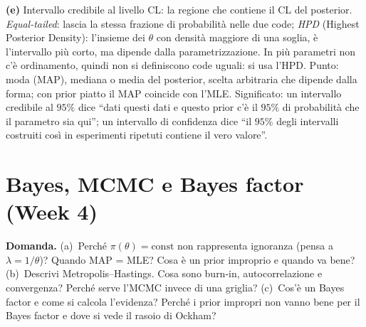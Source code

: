 \documentclass[11pt,a4paper]{article}
\newcommand{\Dom}[1]{\par\medskip\noindent\textbf{Domanda.} #1\par\nopagebreak}
\begin{document}
{\textbf{(e)} Intervallo credibile al livello CL: la regione che contiene il CL del posterior.
\emph{Equal-tailed}: lascia la stessa frazione di probabilit\`a nelle due code; \emph{HPD} (Highest Posterior Density): l'insieme dei $\theta$ con densit\`a maggiore di una soglia, \`e l'intervallo pi\`u corto, ma dipende dalla parametrizzazione.
In pi\`u parametri non c'\`e ordinamento, quindi non si definiscono code uguali: si usa l'HPD.
Punto: moda (MAP), mediana o media del posterior, scelta arbitraria che dipende dalla forma; con prior piatto il MAP coincide con l'MLE.
Significato: un intervallo credibile al $95\%$ dice ``dati questi dati e questo prior c'\`e il $95\%$ di probabilit\`a che il parametro sia qui''; un intervallo di confidenza dice ``il $95\%$ degli intervalli costruiti cos\`i in esperimenti ripetuti contiene il vero valore''.
}

\section{Bayes, MCMC e Bayes factor (Week 4)}

\Dom{(a)~Perch\'e $\pi(\theta)=\text{const}$ non rappresenta ignoranza (pensa a $\lambda=1/\theta$)? Quando MAP = MLE? Cosa \`e un prior improprio e quando va bene?
(b)~Descrivi Metropolis--Hastings. Cosa sono burn-in, autocorrelazione e convergenza? Perch\'e serve l'MCMC invece di una griglia?
(c)~Cos'\`e un Bayes factor e come si calcola l'evidenza? Perch\'e i prior impropri non vanno bene per il Bayes factor e dove si vede il rasoio di Ockham?}
\end{document}
